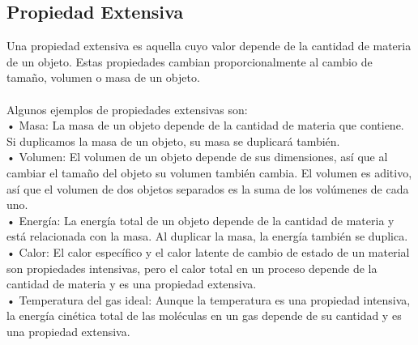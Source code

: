 \documentclass{article}
\begin{document}
\subsection{Propiedad Extensiva}
Una propiedad extensiva es aquella cuyo valor depende de la cantidad de materia de un objeto. Estas propiedades cambian proporcionalmente al cambio de tamaño, volumen o masa de un objeto.\\
\\
Algunos ejemplos de propiedades extensivas son:\\
• Masa: La masa de un objeto depende de la cantidad de materia que contiene. Si duplicamos la masa de un objeto, su masa se duplicará también.\\
• Volumen: El volumen de un objeto depende de sus dimensiones, así que al cambiar el tamaño del objeto su volumen también cambia. El volumen es aditivo, así que el volumen de dos objetos separados es la suma de los volúmenes de cada uno.\\
• Energía: La energía total de un objeto depende de la cantidad de materia y está relacionada con la masa. Al duplicar la masa, la energía también se duplica.\\
• Calor: El calor específico y el calor latente de cambio de estado de un material son propiedades intensivas, pero el calor total en un proceso depende de la cantidad de materia y es una propiedad extensiva.\\
• Temperatura del gas ideal: Aunque la temperatura es una propiedad intensiva, la energía cinética total de las moléculas en un gas depende de su cantidad y es una propiedad extensiva.\\
\end{document}
